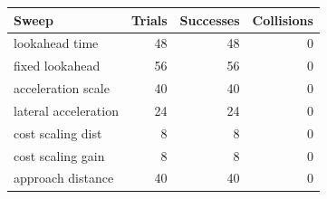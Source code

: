 \begin{tabular}{lrrr}
\hline
Sweep & Trials & Successes & Collisions \\
\hline
lookahead time & 48 & 48 & 0 \\
fixed lookahead & 56 & 56 & 0 \\
acceleration scale & 40 & 40 & 0 \\
lateral acceleration & 24 & 24 & 0 \\
cost scaling dist & 8 & 8 & 0 \\
cost scaling gain & 8 & 8 & 0 \\
approach distance & 40 & 40 & 0 \\
\hline
\end{tabular}
